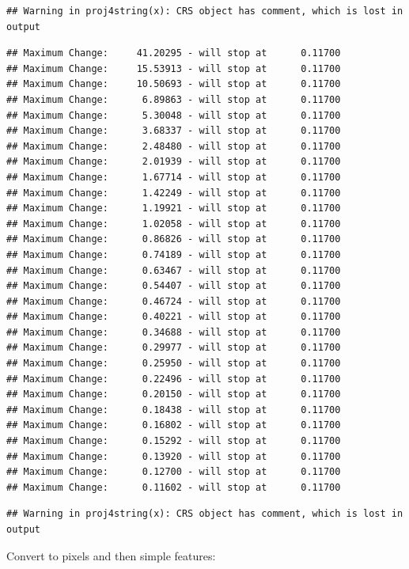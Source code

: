 \documentclass[
]{article}
\begin{document}
\begin{verbatim}
## Warning in proj4string(x): CRS object has comment, which is lost in output
\end{verbatim}

\begin{verbatim}
## Maximum Change:     41.20295 - will stop at      0.11700
## Maximum Change:     15.53913 - will stop at      0.11700
## Maximum Change:     10.50693 - will stop at      0.11700
## Maximum Change:      6.89863 - will stop at      0.11700
## Maximum Change:      5.30048 - will stop at      0.11700
## Maximum Change:      3.68337 - will stop at      0.11700
## Maximum Change:      2.48480 - will stop at      0.11700
## Maximum Change:      2.01939 - will stop at      0.11700
## Maximum Change:      1.67714 - will stop at      0.11700
## Maximum Change:      1.42249 - will stop at      0.11700
## Maximum Change:      1.19921 - will stop at      0.11700
## Maximum Change:      1.02058 - will stop at      0.11700
## Maximum Change:      0.86826 - will stop at      0.11700
## Maximum Change:      0.74189 - will stop at      0.11700
## Maximum Change:      0.63467 - will stop at      0.11700
## Maximum Change:      0.54407 - will stop at      0.11700
## Maximum Change:      0.46724 - will stop at      0.11700
## Maximum Change:      0.40221 - will stop at      0.11700
## Maximum Change:      0.34688 - will stop at      0.11700
## Maximum Change:      0.29977 - will stop at      0.11700
## Maximum Change:      0.25950 - will stop at      0.11700
## Maximum Change:      0.22496 - will stop at      0.11700
## Maximum Change:      0.20150 - will stop at      0.11700
## Maximum Change:      0.18438 - will stop at      0.11700
## Maximum Change:      0.16802 - will stop at      0.11700
## Maximum Change:      0.15292 - will stop at      0.11700
## Maximum Change:      0.13920 - will stop at      0.11700
## Maximum Change:      0.12700 - will stop at      0.11700
## Maximum Change:      0.11602 - will stop at      0.11700
\end{verbatim}

\begin{verbatim}
## Warning in proj4string(x): CRS object has comment, which is lost in output
\end{verbatim}

Convert to pixels and then simple features:
\end{document}
